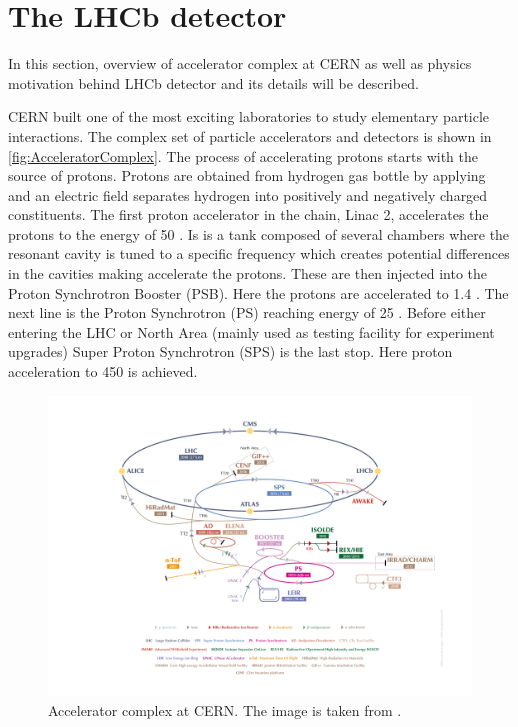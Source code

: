 \chapter{The LHCb detector}
\label{chap:dec}
In this section, overview of accelerator complex at CERN as well as physics motivation behind \Gls{LHCb} detector and its details will be described.

CERN built one of the most exciting laboratories to study elementary particle interactions. The complex set of particle accelerators and detectors is shown in \autoref{fig:AcceleratorComplex}. The process of accelerating protons starts with the source of protons. Protons are obtained from hydrogen gas bottle by applying and an electric field separates hydrogen into positively and negatively charged constituents. The first proton accelerator in the chain, Linac 2, accelerates the protons to the energy of 50 \mev. Is is a tank composed of several chambers where the resonant cavity is tuned to a specific frequency which creates potential differences in the cavities making accelerate the protons. These are then injected into the Proton Synchrotron Booster (PSB). Here the protons are accelerated to 1.4 \gev. The next line is the Proton Synchrotron (PS) reaching energy of 25 \gev. Before either entering the LHC or North Area (mainly used as testing facility for experiment upgrades) Super Proton Synchrotron (SPS) is the last stop. Here proton acceleration to 450 \gev is achieved.

\begin{figure}
  \centering
  \includegraphics[scale = 1.0]{figs/detector/AccComplex.png}
	\caption{Accelerator complex at CERN. The image is taken from \cite{complex}.}
  \label{fig:AcceleratorComplex}
\end{figure}

